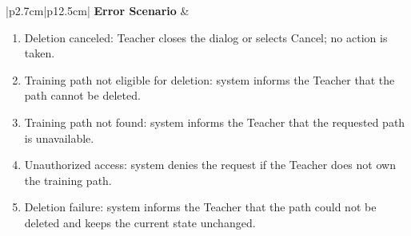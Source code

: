 \begin{table}[H]
\begin{tabular}{|p{2.7cm}|p{12.5cm}|}
        \textbf{Error Scenario} & \begin{minipage}[t]{\linewidth}
            \begin{enumerate}[topsep=0pt,itemsep=1pt,parsep=0pt,partopsep=0pt]
                \item Deletion canceled: Teacher closes the dialog or selects Cancel; no action is taken.
                \item Training path not eligible for deletion: system informs the Teacher that the path cannot be deleted.
                \item Training path not found: system informs the Teacher that the requested path is unavailable.
                \item Unauthorized access: system denies the request if the Teacher does not own the training path.
                \item Deletion failure: system informs the Teacher that the path could not be deleted and keeps the current state unchanged.
            \end{enumerate}
        \end{minipage} \\ \hline
    \end{tabular}
    \label{tab:teacher-delete-training-path}
\end{table}



